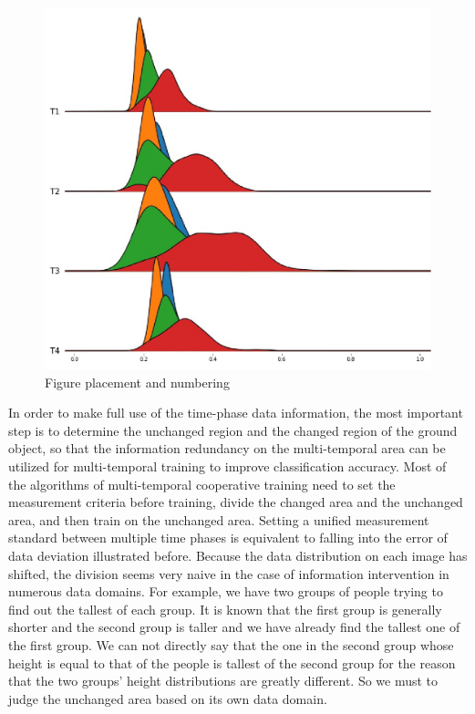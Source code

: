 \documentclass{isprs} %
\begin{document}
\begin{figure}[ht!]
	\begin{center}
			\includegraphics[width=1.0\columnwidth]{figures/images/temporal_difference1.jpg}
		\caption{Figure placement and numbering}
	\label{fig:figure_placement}
	\end{center}
\end{figure}
In order to make full use of the time-phase data information, the most important step is to determine the unchanged region and the changed region of the ground object, so that the information redundancy on the multi-temporal area can be utilized for multi-temporal training to improve classification accuracy. Most of the algorithms of multi-temporal cooperative training need to set the measurement criteria before training, divide the changed area and the unchanged area, and then train on the unchanged area. Setting a unified measurement standard between multiple time phases is equivalent to falling into the error of data deviation illustrated before. Because the data distribution on each image has shifted, the division seems very naive in the case of information intervention in numerous data domains. For example, we have two groups of people trying to find out the tallest of each group. It is known that the first group is generally shorter and the second group is taller and we have already find the tallest one of the first group. We can not directly say that the one in the second group whose height is equal to that of the people is tallest of the second group for the reason that the two groups’ height distributions are greatly different. So we must to judge the unchanged area based on its own data domain.
\end{document}
